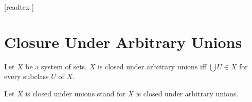 \documentclass[10pt]{article}
\begin{document}
  \begin{imports}
    \begin{forthel}
      [readtex ]
    \end{forthel}
  \end{imports}


  \section*{Closure Under Arbitrary Unions}

  \begin{forthel}
    \begin{definition}[id=FOUNDATIONS_14_3959378992431104,printid]
      Let $X$ be a system of sets.
      $X$ is closed under arbitrary unions iff $\bigcup U \in X$ for every  subclass $U$ of $X$.
    \end{definition}

    Let $X$ is closed under unions stand for $X$ is closed under arbitrary unions.
  \end{forthel}
\end{document}
